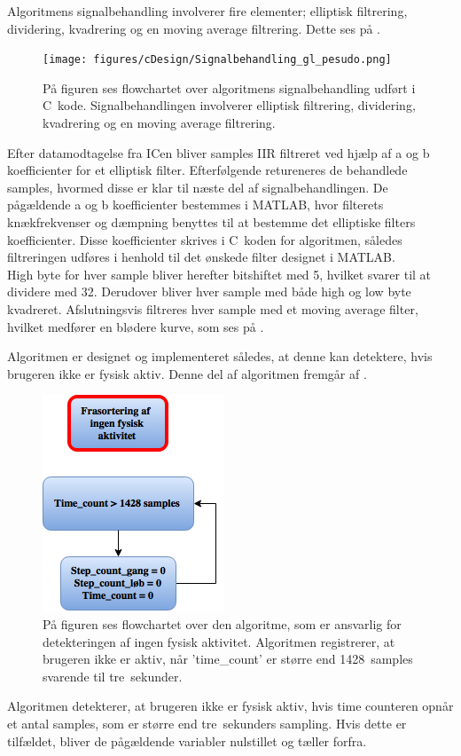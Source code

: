 Algoritmens signalbehandling involverer fire elementer; elliptisk filtrering, dividering, kvadrering og en moving average filtrering. Dette ses på .
\begin{figure}[H]
	\centering
	\texttt{[image: figures/cDesign/Signalbehandling\_gl\_pesudo.png]}
	\caption{På figuren ses flowchartet over algoritmens signalbehandling udført i C~kode. Signalbehandlingen involverer elliptisk filtrering, dividering, kvadrering og en moving average filtrering.}
	\label{fig:signalbehandling_g_l}
\end{figure}\vspace{-0.25cm}
Efter datamodtagelse fra ICen bliver samples IIR filtreret ved hjælp af a og b koefficienter for et elliptisk filter. Efterfølgende retureneres de behandlede samples, hvormed disse er klar til næste del af signalbehandlingen. De pågældende a og b koefficienter bestemmes i MATLAB, hvor filterets knækfrekvenser og dæmpning benyttes til at bestemme det elliptiske filters koefficienter. Disse koefficienter skrives i C~koden for algoritmen, således filtreringen udføres i henhold til det ønskede filter designet i MATLAB.\\
High byte for hver sample bliver herefter bitshiftet med 5, hvilket svarer til at dividere med 32. Derudover bliver hver sample med både high og low byte kvadreret. Afslutningsvis filtreres hver sample med et moving average filter, hvilket medfører en blødere kurve, som ses på .

Algoritmen er designet og implementeret således, at denne kan detektere, hvis brugeren ikke er fysisk aktiv. Denne del af algoritmen fremgår af .
\begin{figure}[H]
	\centering
	\includegraphics[scale=0.6]{figures/cDesign/ingen_aktivitet_gl_pseudo.png}
	\caption{På figuren ses flowchartet over den algoritme, som er ansvarlig for detekteringen af ingen fysisk aktivitet. Algoritmen registrerer, at brugeren ikke er aktiv, når 'time\_count' er større end 1428~samples svarende til tre~sekunder.}
	\label{fig:ingen_ak_pseudo}
\end{figure}\vspace{-0.25cm}
Algoritmen detekterer, at brugeren ikke er fysisk aktiv, hvis time counteren opnår et antal samples, som er større end tre~sekunders sampling. Hvis dette er tilfældet, bliver de pågældende variabler nulstillet og tæller forfra.

